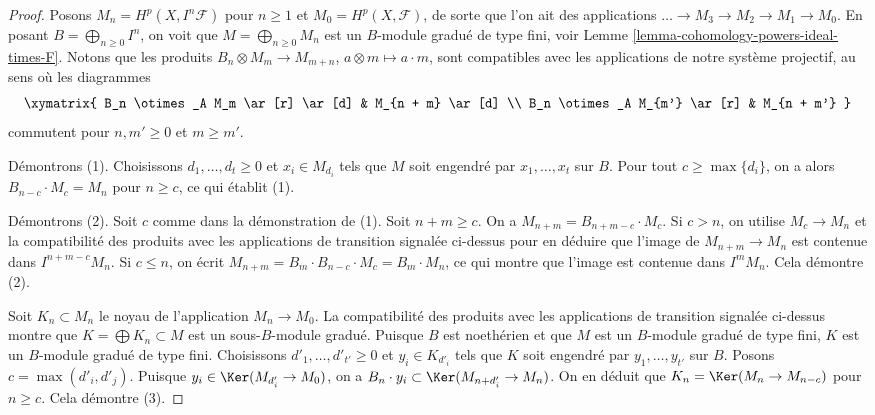 \begin{proof}
Posons $M_n = H^p(X, I^n\mathcal{F})$ pour $n \geq 1$ et
$M_0 = H^p(X, \mathcal{F})$, de sorte que l'on ait des applications
$\ldots \to M_3 \to M_2 \to M_1 \to M_0$. En posant
$B = \bigoplus_{n \geq 0} I^n$, on voit que $M = \bigoplus_{n \geq 0} M_n$
est un $B$-module gradué de type fini, voir
Lemme \ref{lemma-cohomology-powers-ideal-times-F}.
Notons que les produits
$B_n \otimes M_m \to M_{m + n}$, $a \otimes m \mapsto a \cdot m$,
sont compatibles avec les applications de notre système projectif, au sens
où les diagrammes
$$
\xymatrix{
B_n \otimes_A M_m \ar[r] \ar[d] & M_{n + m} \ar[d] \\
B_n \otimes_A M_{m'} \ar[r] & M_{n + m'}
}
$$
commutent pour $n, m' \geq 0$ et $m \geq m'$.

\medskip\noindent
Démontrons (1). Choisissons $d_1, \ldots, d_t \geq 0$ et $x_i \in M_{d_i}$
tels que $M$ soit engendré par $x_1, \ldots, x_t$ sur $B$.
Pour tout $c \geq \max\{d_i\}$, on a alors
$B_{n - c} \cdot M_c = M_n$ pour $n \geq c$, ce qui établit (1).

\medskip\noindent
Démontrons (2). Soit $c$ comme dans la démonstration de (1). Soit $n + m \geq c$.
On a $M_{n + m} = B_{n + m - c} \cdot M_c$.
Si $c > n$, on utilise $M_c \to M_n$ et la compatibilité des produits
avec les applications de transition signalée ci-dessus pour en déduire que
l'image de $M_{n + m} \to M_n$ est contenue dans $I^{n + m - c}M_n$.
Si $c \leq n$, on écrit $M_{n + m} = B_m \cdot B_{n - c} \cdot M_c =
B_m \cdot M_n$, ce qui montre que l'image est contenue dans $I^m M_n$.
Cela démontre (2).

\medskip\noindent
Soit $K_n \subset M_n$ le noyau de l'application $M_n \to M_0$.
La compatibilité des produits avec les applications de transition
signalée ci-dessus montre que $K = \bigoplus K_n \subset M$ est un sous-$B$-module gradué.
Puisque $B$ est noethérien et que $M$ est un $B$-module gradué de type fini,
$K$ est un $B$-module gradué de type fini.
Choisissons $d'_1, \ldots, d'_{t'} \geq 0$ et $y_i \in K_{d'_i}$
tels que $K$ soit engendré par $y_1, \ldots, y_{t'}$ sur $B$.
Posons $c = \max(d'_i, d'_j)$. Puisque $y_i \in \Ker(M_{d'_i} \to M_0)$,
on a $B_n \cdot y_i \subset \Ker(M_{n + d'_i} \to M_n)$.
On en déduit que $K_n = \Ker(M_n \to M_{n - c})$ pour $n \geq c$.
Cela démontre (3).


\end{proof}
